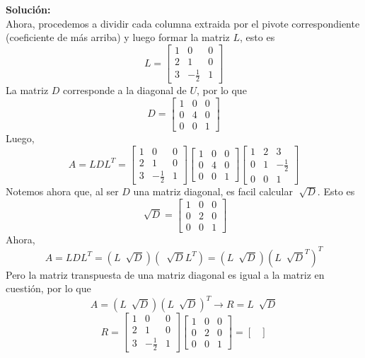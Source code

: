 \documentclass[12pt]{article}
\newenvironment{solucion}
{\begin{mdframed}[backgroundcolor=black!10]
		{\bf Solución:}\\
	}
	{
	\end{mdframed}
}
\newenvironment{preguntas}
{\begin{enumerate}\itemsep12pt
	}
	{
	\end{enumerate}
}
\newcommand{\ra}{\rightarrow}
\begin{document}
\begin{preguntas}
\begin{solucion}
		Ahora, procedemos a dividir cada columna extraida por el pivote correspondiente (coeficiente de más arriba) y luego formar la matriz $L$, esto es
		$$L = \begin{bmatrix}
		1 & 0 & 0\\
		2 & 1 & 0\\
		3 & -\frac{1}{2} & 1
		\end{bmatrix}$$
		La matriz $D$ corresponde a la diagonal de $U$, por lo que
		$$D =\begin{bmatrix}
		1 & 0 & 0\\
		0 & 4 & 0 \\
		0 & 0 & 1\end{bmatrix}$$
		Luego,
		$$A = LDL^T = \begin{bmatrix}
		1 & 0 & 0\\
		2 & 1 & 0\\
		3 & -\frac{1}{2} & 1
		\end{bmatrix}
		\begin{bmatrix}
		1 & 0 & 0\\
		0 & 4 & 0 \\
		0 & 0 & 1\end{bmatrix}
		\begin{bmatrix}
		1 & 2 & 3\\
		0 & 1 & -\frac{1}{2}\\
		0 & 0 & 1
		\end{bmatrix}$$
		Notemos ahora que, al ser $D$ una matriz diagonal, es facil calcular $\sqrt[]{D}$. Esto es
		$$\sqrt[]{D} = 
		\begin{bmatrix}
		1 & 0 & 0\\
		0 & 2 & 0 \\
		0 & 0 & 1
		\end{bmatrix}$$
		Ahora,
		$$A = LDL^T = (L\ \sqrt[]{D})(\ \sqrt[]{D}L^T) = (L\ \sqrt[]{D})(L\ \sqrt[]{D}^T)^T $$
		Pero la matriz transpuesta de una matriz diagonal es igual a la matriz en cuestión, por lo que
		$$A = (L\ \sqrt[]{D})(L\ \sqrt[]{D})^T \ra R = L\ \sqrt[]{D}$$
		$$R = \begin{bmatrix}
		1 & 0 & 0\\
		2 & 1 & 0\\
		3 & -\frac{1}{2} & 1
		\end{bmatrix}
		\begin{bmatrix}
		1 & 0 & 0\\
		0 & 2 & 0 \\
		0 & 0 & 1
		\end{bmatrix} = \begin{bmatrix}

\end{bmatrix}$$
\end{solucion}
\end{preguntas}
\end{document}
